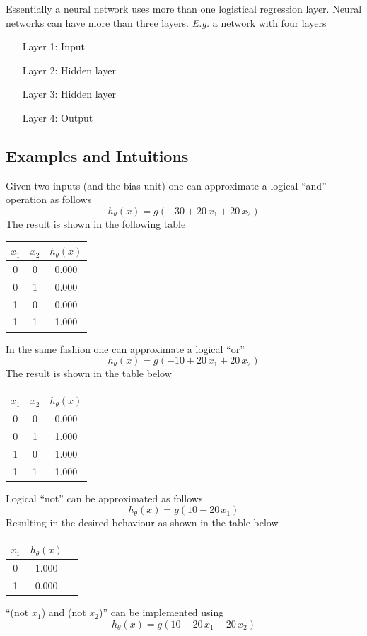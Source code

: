 \documentclass[a4paper,twoside,10pt]{article}
\begin{document}
Essentially a neural network uses more than one logistical regression layer.
Neural networks can have more than three layers. \emph{E.g.} a network with four layers
\begin{itemize}
  \item [Layer 1:] Input
  \item [Layer 2:] Hidden layer
  \item [Layer 3:] Hidden layer
  \item [Layer 4:] Output
\end{itemize}

\subsection{Examples and Intuitions}
Given two inputs (and the bias unit) one can approximate a logical ``and'' operation as follows
\begin{equation*}
  h_\theta(x)=g(-30+20\,x_1+20\,x_2)
\end{equation*}
The result is shown in the following table
\begin{center}
  \begin{tabular}{cc|c}
    $x_1$ & $x_2$ & $h_\theta(x)$\\\hline
    0 & 0 & 0.000\\
    0 & 1 & 0.000\\
    1 & 0 & 0.000\\
    1 & 1 & 1.000\\
  \end{tabular}
\end{center}
In the same fashion one can approximate a logical ``or''
\begin{equation*}
  h_\theta(x)=g(-10+20\,x_1+20\,x_2)
\end{equation*}
The result is shown in the table below
\begin{center}
  \begin{tabular}{cc|c}
    $x_1$ & $x_2$ & $h_\theta(x)$\\\hline
    0 & 0 & 0.000\\
    0 & 1 & 1.000\\
    1 & 0 & 1.000\\
    1 & 1 & 1.000\\
  \end{tabular}
\end{center}
Logical ``not'' can be approximated as follows
\begin{equation*}
  h_\theta(x)=g(10-20\,x_1)
\end{equation*}
Resulting in the desired behaviour as shown in the table below
\begin{center}
  \begin{tabular}{cc|c}
    $x_1$ & $h_\theta(x)$\\\hline
    0 & 1.000\\
    1 & 0.000\\
  \end{tabular}
\end{center}
``(not $x_1$) and (not $x_2$)'' can be implemented using
\begin{equation*}
  h_\theta(x)=g(10-20\,x_1-20\,x_2)
\end{equation*}
\end{document}
